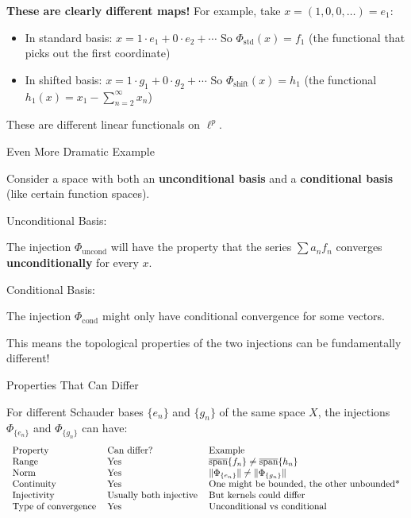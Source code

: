 \documentclass[aps,preprint]{revtex4}
\newenvironment{answer}
  {\begin{tcolorbox}[colback=green!5!white,colframe=green!75!black,title=Answer]}
  {\end{tcolorbox}}
\begin{document}
\begin{answer}
\textbf{These are clearly different maps!} For example, take $x =
(1,0,0,\dots) = e_1$:

\begin{itemize}
\item In standard basis: $x = 1\cdot e_1 + 0\cdot e_2 + \cdots$ \newline
So $\Phi_{\text{std}}(x) = f_1$ (the functional that picks out the first
coordinate)

\item In shifted basis: $x = 1\cdot g_1 + 0\cdot g_2 + \cdots$ \newline
So $\Phi_{\text{shift}}(x) = h_1$ (the functional $h_1(x) = x_1 -
\sum_{n=2}^\infty x_n$)
\end{itemize}

These are different linear functionals on $\ell^p$.

Even More Dramatic Example

Consider a space with both an \textbf{unconditional basis} and a \textbf{%
conditional basis} (like certain function spaces).

Unconditional Basis:

The injection $\Phi_{\text{uncond}}$ will have the property that the series $%
\sum a_n f_n$ converges \textbf{unconditionally} for every $x$.

Conditional Basis:

The injection $\Phi_{\text{cond}}$ might only have conditional convergence
for some vectors.

This means the topological properties of the two injections can be
fundamentally different!

Properties That Can Differ

For different Schauder bases $\{e_{n}\}$ and $\{g_{n}\}$ of the same space $%
X $, the injections $\Phi _{\{e_{n}\}}$ and $\Phi _{\{g_{n}\}}$ can have:%
\begin{equation}
\begin{tabular}{lll}
Property & Can differ? & Example \\ 
Range & Yes & $\overline{\text{span}}\{f_{n}\}\neq \overline{\text{span}}%
\{h_{n}\}$ \\ 
Norm & Yes & $\Vert \Phi _{\{e_{n}\}}\Vert \neq \Vert \Phi _{\{g_{n}\}}\Vert 
$ \\ 
Continuity & Yes & One might be bounded, the other unbounded* \\ 
Injectivity & Usually both injective & But kernels could differ \\ 
Type of convergence & Yes & Unconditional vs conditional \\ 
&  & 
\end{tabular}%
\end{equation}


\end{answer}
\end{document}
